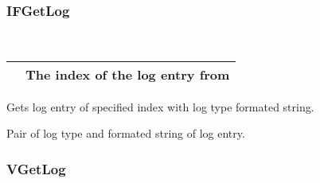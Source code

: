 \documentclass[letterpaper,10pt,english]{sphinxmanual}
\begin{document}
\subsubsection{IFGetLog}
\label{\detokenize{log:ifgetlog}}

\begin{fulllineitems}
\label{\detokenize{log:_CPPv2N6pessum8IFGetLogEi}}%
\pysigstartmultiline
{}%
\pysigstopmultiline~

\begin{savenotes}\sphinxattablestart
\centering
\begin{tabulary}{\linewidth}[t]{|T|T|}
\hline

&
The index of the log entry from {\hyperref[\detokenize{log:_CPPv2N6pessum11global_logsE}]{}}
\\
\hline
\end{tabulary}
\par
\sphinxattableend\end{savenotes}

Gets log entry of specified index with log type formated string.

 Pair of log type and formated string of log entry.

\end{fulllineitems}



\subsubsection{VGetLog}
\label{\detokenize{log:vgetlog}}
\end{document}

